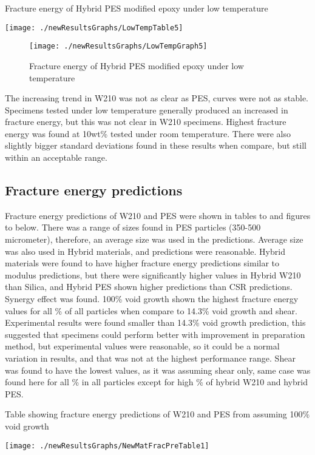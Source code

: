 \documentclass[numbers=noendperiod,chapterprefix=on]{icldt} %
\begin{document}
\begin{table}[!hp]
\centering
\caption{Fracture energy of Hybrid PES modified epoxy under low temperature} %
\texttt{[image: ./newResultsGraphs/LowTempTable5]}
\end{table}
\FloatBarrier

\begin{figure}[!bp]
\centering
\texttt{[image: ./newResultsGraphs/LowTempGraph5]}
\caption{Fracture energy of Hybrid PES modified epoxy under low temperature}
\end{figure}
\FloatBarrier

The increasing trend in W210 was not as clear as PES, curves were not as stable. Specimens tested under low temperature generally produced an increased in fracture energy, but this was not clear in W210 specimens. Highest fracture energy was found at 10wt\% tested under room temperature. There were also slightly bigger standard deviations found in these results when compare, but still within an acceptable range.  


\subsection{Fracture energy predictions}
Fracture energy predictions of W210 and PES were shown in tables to and figures to below. There was a range of sizes found in PES particles (350-500 micrometer), therefore, an average size was used in the predictions. Average size was also used in Hybrid materials, and predictions were reasonable. Hybrid materials were found to have higher fracture energy predictions similar to modulus predictions, but there were significantly higher values in Hybrid W210 than Silica, and Hybrid PES shown higher predictions than CSR predictions. Synergy effect was found. 100\% void growth shown the highest fracture energy values for all \% of all particles when compare to 14.3\% void growth and shear. Experimental results were found smaller than 14.3\% void growth prediction, this suggested that specimens could perform better with improvement in preparation method, but experimental values were reasonable, so it could be a normal variation in results, and that was not at the highest performance range. Shear was found to have the lowest values, as it was assuming shear only, same case was found here for all \% in all particles except for high \% of hybrid W210 and hybrid PES. 

\begin{table}[!hp]
\centering
\caption{Table showing fracture energy predictions of W210 and PES from assuming 100\% void growth} %
\texttt{[image: ./newResultsGraphs/NewMatFracPreTable1]}
\end{table}
\FloatBarrier
\end{document}
